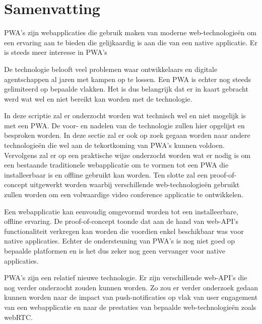 





\chapter*{Samenvatting}

PWA's zijn webapplicaties die gebruik maken van moderne web-technologieën om een ervaring aan te bieden die gelijkaardig is aan die van een native applicatie. Er is steeds meer interesse in PWA's \autocite{googleTrends2020}

De technologie belooft veel problemen waar ontwikkelaars en digitale agentschappen al jaren met kampen op te lossen.  Een PWA is echter nog steeds gelimiteerd op bepaalde vlakken. 
Het is dus belangrijk dat er in kaart gebracht werd wat wel en niet bereikt kan worden met de technologie.

In deze scriptie zal er onderzocht worden wat technisch wel en niet mogelijk is met een PWA. De voor- en nadelen van de technologie zullen hier opgelijst en besproken worden.
In deze sectie zal er ook op zoek gegaan worden naar andere technologieën die wel aan de tekortkoming van PWA's kunnen voldoen.
Vervolgens zal er op een praktische wijze onderzocht worden wat er nodig is om een bestaande traditionele webapplicatie om te vormen tot een PWA die installeerbaar is en offline gebruikt kan worden.
Ten slotte zal een proof-of-concept uitgewerkt worden waarbij verschillende web-technologieën gebruikt zullen worden om een volwaardige video conference applicatie te ontwikkelen. 

Een webapplicatie kan eenvoudig omgevormd worden tot een installeerbare, offline ervaring. De proof-of-concept toonde dat aan de hand van web-API's functionaliteit verkregen kan worden die voordien enkel beschikbaar was voor native applicaties.
Echter de ondersteuning van PWA's is nog niet goed op bepaalde platformen en is het dus zeker nog geen vervanger voor native applicaties.

PWA's zijn een relatief nieuwe technologie. Er zijn verschillende web-API's die nog verder onderzocht zouden kunnen worden. Zo zou er verder onderzoek gedaan kunnen worden naar de impact van push-notificaties op vlak van user engagement van een webapplicatie en naar de prestaties van bepaalde web-technologieën zoals webRTC.